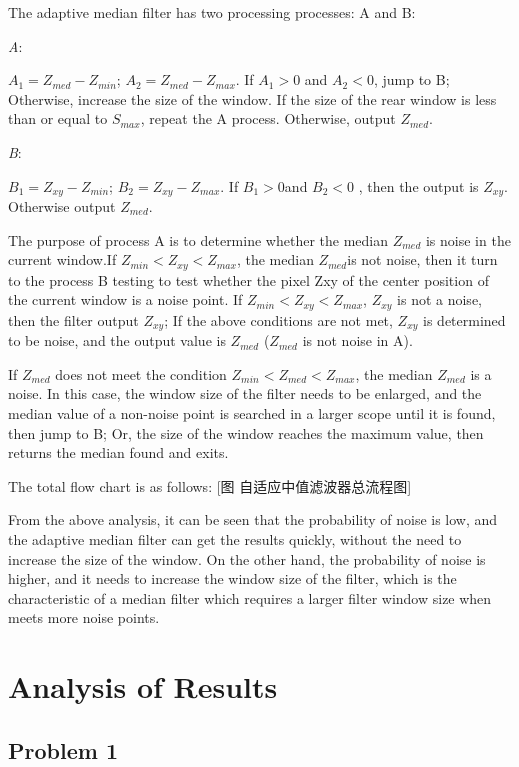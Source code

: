 \documentclass{mcmthesis}
\begin{document}
The adaptive median filter has two processing processes: A and B:

\emph{A}:

$A_1 = Z_{med}−Z_{min}$;   
$A_2 = Z_{med}−Z_{max}$.  
If $A_1 > 0$ and $A_2 < 0$, jump to B;
Otherwise, increase the size of the window.
If the size of the rear window is less than or equal to $S_{max}$, repeat the A process.
Otherwise, output $Z_{med}$.

\emph{B}:

$B_1 = Z_{xy}−Z_{min}$;  
$B_2 = Z_{xy}−Z_{max}$.  
If $B_1>0$and $B_2<0$ , then the output is $Z_{xy}$.
Otherwise output $Z_{med}$.


The purpose of process A is to determine whether the median $Z_{med}$ is noise in the current window.If $Z_{min} < Z_{xy} < Z_{max}$, the median $Z_{med}$is not noise, then it turn to the process B testing to test whether the pixel Zxy of the center position of the current window is a noise point.
If $Z_{min} < Z_{xy} < Z_{max}$, $Z_{xy}$ is not a noise, then the filter output $Z_{xy}$; If the above conditions are not met, $Z_{xy}$ is determined to be noise, and the output value is $Z_{med}$ ($Z_{med}$ is not noise in A).

If $Z_{med}$ does not meet the condition $Z_{min}<Z_{med}<Z_{max}$, the median $Z_{med}$ is a noise. In this case, the window size of the filter needs to be enlarged, and the median value of a non-noise point is searched in a larger scope until it is found, then jump to B; Or, the size of the window reaches the maximum value, then returns the median found and exits.

The total flow chart is as follows:
[图  自适应中值滤波器总流程图]

From the above analysis, it can be seen that the probability of noise is low, and the adaptive median filter can get the results quickly, without the need to increase the size of the window. On the other hand, the probability of noise is higher, and it needs to increase the window size of the filter, which is the characteristic of a median filter which requires a larger filter window size when meets more noise points.

\section{Analysis of Results}
\subsection{Problem 1}
\end{document}
